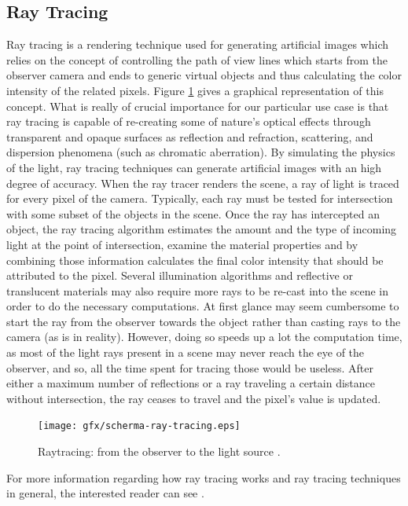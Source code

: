 \subsection{Ray Tracing}
Ray tracing is a rendering technique used for generating artificial images which relies on the concept of controlling the path of view lines which starts from the observer camera and ends to generic virtual objects and thus calculating the color intensity of the related pixels. Figure \ref{fig:raytracing} gives a graphical representation of this concept. What is really of crucial importance for our particular use case is that ray tracing is capable of re-creating some of nature's optical effects through transparent and opaque surfaces as reflection and refraction, scattering, and dispersion phenomena (such as chromatic aberration).
By simulating the physics of the light, ray tracing techniques can generate artificial images with an high degree of accuracy.
When the ray tracer renders the scene, a ray of light is traced for every pixel of the camera. Typically, each ray must be tested for intersection with some subset of the objects in the scene. Once the ray has intercepted an object, the ray tracing algorithm estimates the amount and the type of incoming light at the point of intersection, examine the material properties and by combining those information calculates the final color intensity that should be attributed to the pixel.
Several illumination algorithms and reflective or translucent materials may also require more rays to be re-cast into the scene in order to do the necessary computations.
At first glance may seem cumbersome to start the ray from the observer towards the object rather than casting rays to the camera (as is in reality). However, doing so speeds up a lot the computation time, as most of the light rays present in a scene may never reach the eye of the observer, and so, all the time spent for tracing those would be useless.
After either a maximum number of reflections or a ray traveling a certain distance without intersection, the ray ceases to travel and the pixel's value is updated.

\begin{figure}[htbp]
  \centering
  \texttt{[image: gfx/scherma-ray-tracing.eps]}
  \caption{Raytracing: from the observer to the light source \cite{pictraytracing}.}
  \label{fig:raytracing}
\end{figure}

For more information regarding how ray tracing works and ray tracing techniques in general, the interested reader can see \cite{introductionraytracing}.

